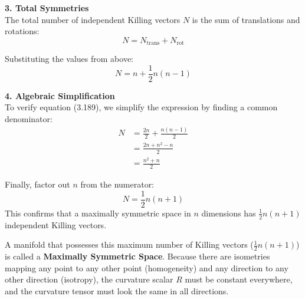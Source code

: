 \documentclass[11pt, a4paper]{report}
\begin{document}
\noindent \textbf{3. Total Symmetries} \\
The total number of independent Killing vectors $N$ is the sum of translations and rotations:
\begin{equation}
    N = N_{\text{trans}} + N_{\text{rot}}
\end{equation}

Substituting the values from above:
\begin{equation}
    N = n + \frac{1}{2}n(n-1)
\end{equation}

\vspace{1em}

\noindent \textbf{4. Algebraic Simplification} \\
To verify equation (3.189), we simplify the expression by finding a common denominator:
\begin{align*}
    N &= \frac{2n}{2} + \frac{n(n-1)}{2} \\[10pt]
    &= \frac{2n + n^2 - n}{2} \\[10pt]
    &= \frac{n^2 + n}{2}
\end{align*}

Finally, factor out $n$ from the numerator:
\begin{equation}
    N = \frac{1}{2}n(n+1)
\end{equation}
This confirms that a maximally symmetric space in $n$ dimensions has $\frac{1}{2}n(n+1)$ independent Killing vectors.

A manifold that possesses this maximum number of Killing vectors ($\frac{1}{2}n(n+1)$) is called a \textbf{Maximally Symmetric Space}.
Because there are isometries mapping any point to any other point (homogeneity) and any direction to any other direction (isotropy), the curvature scalar $R$ must be constant everywhere, and the curvature tensor must look the same in all directions.
\end{document}
